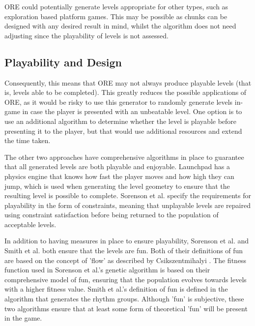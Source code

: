 \documentclass{scrartcl}
\begin{document}
ORE could potentially generate levels appropriate for other types, such as exploration based platform games. This may be possible as chunks can be designed with any desired result in mind, whilst the algorithm does not need adjusting since the playability of levels is not assessed.


\subsection{Playability and Design}
Consequently, this means that ORE may not always produce playable levels (that is, levels able to be completed). This greatly reduces the possible applications of ORE, as it would be risky to use this generator to randomly generate levels in-game in case the player is presented with an unbeatable level. One option is to use an additional algorithm to determine whether the level is playable before presenting it to the player, but that would use additional resources and extend the time taken.

The other two approaches have comprehensive algorithms in place to guarantee that all generated levels are both playable and enjoyable. Launchpad has a physics engine that knows how fast the player moves and how high they can jump, which is used when generating the level geometry to ensure that the resulting level is possible to complete.
Sorenson et al. specify the requirements for playability in the form of constraints, meaning that unplayable levels are repaired using constraint satisfaction before being returned to the population of acceptable levels. 

In addition to having measures in place to ensure playability, Sorenson et al. and Smith et al. both ensure that the levels are fun. Both of their definitions of fun are based on the concept of 'flow' as described by Csikszentmihalyi \cite{the source cited in the papers}. The fitness function used in Sorenson et al.'s genetic algorithm is based on their comprehensive model of fun\cite{sorenson:fun}, ensuring that the population evolves towards levels with a higher fitness value. Smith et al.'s definition of fun is defined in the algorithm that generates the rhythm groups. Although 'fun' is subjective, these two algorithms ensure that at least some form of theoretical 'fun' will be present in the game.
\end{document}

